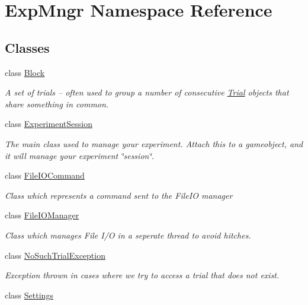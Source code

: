 \hypertarget{namespace_exp_mngr}{}\section{Exp\+Mngr Namespace Reference}
\label{namespace_exp_mngr}
\subsection*{Classes}
\begin{DoxyCompactItemize}
\item 
class \hyperlink{class_exp_mngr_1_1_block}{Block}
\begin{DoxyCompactList}\small\item\em A set of trials – often used to group a number of consecutive \hyperlink{class_exp_mngr_1_1_trial}{Trial} objects that share something in common. \end{DoxyCompactList}\item 
class \hyperlink{class_exp_mngr_1_1_experiment_session}{Experiment\+Session}
\begin{DoxyCompactList}\small\item\em The main class used to manage your experiment. Attach this to a gameobject, and it will manage your experiment \char`\"{}session\char`\"{}. \end{DoxyCompactList}\item 
class \hyperlink{class_exp_mngr_1_1_file_i_o_command}{File\+I\+O\+Command}
\begin{DoxyCompactList}\small\item\em Class which represents a command sent to the File\+IO manager \end{DoxyCompactList}\item 
class \hyperlink{class_exp_mngr_1_1_file_i_o_manager}{File\+I\+O\+Manager}
\begin{DoxyCompactList}\small\item\em Class which manages File I/O in a seperate thread to avoid hitches. \end{DoxyCompactList}\item 
class \hyperlink{class_exp_mngr_1_1_no_such_trial_exception}{No\+Such\+Trial\+Exception}
\begin{DoxyCompactList}\small\item\em Exception thrown in cases where we try to access a trial that does not exist. \end{DoxyCompactList}\item 
class \hyperlink{class_exp_mngr_1_1_settings}{Settings}

\end{DoxyCompactItemize}
